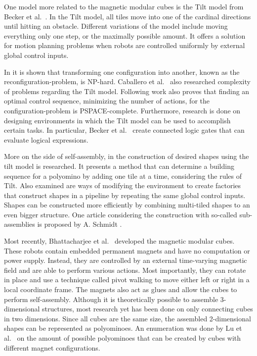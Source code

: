 One model more related to the magnetic modular cubes is the Tilt model from Becker et al.\ \cite{Becker2014_SP}.
In the Tilt model, all tiles move into one of the cardinal directions until hitting an obstacle.
Different variations of the model include moving everything only one step, or the maximally possible amount.
It offers a solution for motion planning problems when robots are controlled uniformly by external global control inputs.

In \cite{Becker2014_SP} it is shown that transforming one configuration into another, known as the reconfiguration-problem, is NP-hard.
Caballero et al.\ \cite{caballero2020} also researched complexity of problems regarding the Tilt model.
Following work \cite{Becker2014} also proves that finding an optimal control sequence, minimizing the number of actions, for the configuration-problem is PSPACE-complete.
Furthermore, research is done on designing environments in which the Tilt model can be used to accomplish certain tasks.
In particular, Becker et al.\ \cite{Becker2014} create connected logic gates that can evaluate logical expressions.

More on the side of self-assembly, in \cite{Becker2020} the construction of desired shapes using the tilt model is researched.
It presents a method that can determine a building sequence for a polyomino by adding one tile at a time, considering the rules of Tilt.
Also examined are ways of modifying the environment to create factories that construct shapes in a pipeline by repeating the same global control inputs.
Shapes can be constructed more efficiently by combining multi-tiled shapes to an even bigger structure.
One article considering the construction with so-called sub-assemblies is proposed by A. Schmidt \cite{Schmidt2018}.

Most recently, Bhattacharjee et al.\ \cite{Bhattacharjee2022} developed the magnetic modular cubes.
These robots contain embedded permanent magnets and have no computation or power supply.
Instead, they are controlled by an external time-varying magnetic field and are able to perform various actions.
Most importantly, they can rotate in place and use a technique called pivot walking to move either left or right in a local coordinate frame.
The magnets also act as glues and allow the cubes to perform self-assembly.
Although it is theoretically possible to assemble 3-dimensional structures, most research yet has been done on only connecting cubes in two dimensions.
Since all cubes are the same size, the assembled 2-dimensional shapes can be represented as polyominoes.
An enumeration was done by Lu et al.\ \cite{Lu2021} on the amount of possible polyominoes that can be created by cubes with different magnet configurations.

